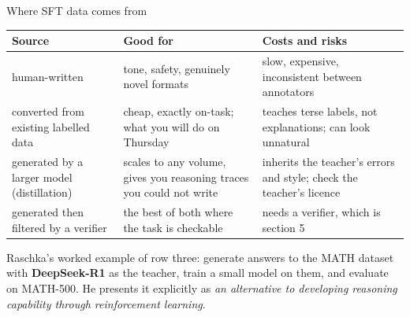 \documentclass[aspectratio=169,10pt]{beamer}
\begin{document}
\iffalse
\begin{frame}[shrink=19]{Where SFT data comes from}
  \centering
  \begin{tabular}{@{}L{2.6cm} L{4.2cm} L{4.2cm}@{}}
    \toprule
    \textbf{Source} & \textbf{Good for} & \textbf{Costs and risks}\\
    \midrule
    human-written & tone, safety, genuinely novel formats & slow, expensive,
      inconsistent between annotators\\[0.3em]
    converted from existing labelled data & cheap, exactly on-task; what you
      will do on Thursday & teaches terse labels, not explanations; can look
      unnatural\\[0.3em]
    generated by a larger model (distillation) & scales to any volume, gives
      you reasoning traces you could not write & inherits the teacher's errors
      and style; check the teacher's licence\\[0.3em]
    generated then filtered by a verifier & the best of both where the task is
      checkable & needs a verifier, which is section 5\\
    \bottomrule
  \end{tabular}

  \vspace{0.7em}
  \raggedright
  \small
  Raschka's worked example of row three: generate answers to the MATH dataset
  with \textbf{DeepSeek-R1} as the teacher, train a small model on them, and
  evaluate on MATH-500. He presents it explicitly as \emph{an alternative to
  developing reasoning capability through reinforcement learning}.
\end{frame}
\end{document}
